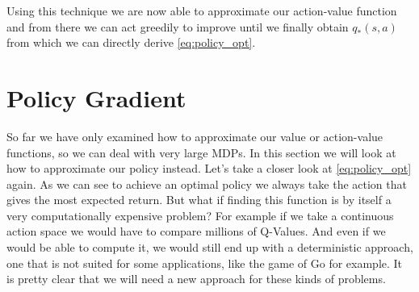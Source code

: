 Using this technique we are now able to approximate our action-value function and from there we can act greedily to improve until we finally obtain $q_{*}(s,a)$ from which we can directly derive \ref{eq:policy_opt}.

\section{Policy Gradient}


So far we have only examined how to approximate our value or action-value functions, so we can deal with very large MDPs.
In this section we will look at how to approximate our policy instead.
Let's take a closer look at \ref{eq:policy_opt} again.
As we can see to achieve an optimal policy we always take the action that gives the most expected return.
But what if finding this function is by itself a very computationally expensive problem?
For example if we take a continuous action space we would have to compare millions of Q-Values.
And even if we would be able to compute it, we would still end up with a deterministic approach, one that is not suited for some applications, like the game of Go for example.
It is pretty clear that we will need a new approach for these kinds of problems.


